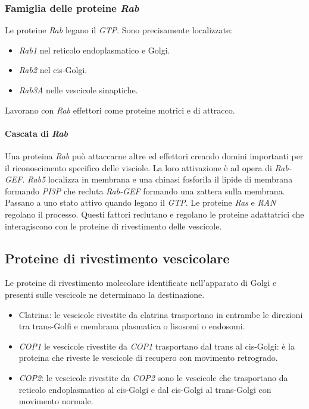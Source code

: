 		\subsubsection{Famiglia delle proteine \emph{Rab}}
		Le proteine \emph{Rab} legano il \emph{GTP}.
		Sono precisamente localizzate:
		\begin{multicols}{3}
			\begin{itemize}
				\item \emph{Rab1} nel reticolo endoplasmatico e Golgi.
				\item \emph{Rab2} nel cis-Golgi.
				\item \emph{Rab3A} nelle vescicole sinaptiche.
			\end{itemize}
		\end{multicols}
		Lavorano con \emph{Rab} effettori come proteine motrici e di attracco.

			\paragraph{Cascata di \emph{Rab}}
			Una proteina \emph{Rab} pu\`o attaccarne altre ed effettori creando domini importanti per il riconoscimento specifico delle visciole.
			La loro attivazione \`e ad opera di \emph{Rab-GEF}.
			\emph{Rab5} localizza in membrana e una chinasi fosforila il lipide di membrana formando \emph{PI3P} che recluta \emph{Rab-GEF} formando una zattera sulla membrana.
			Passano a uno stato attivo quando legano il \emph{GTP}.
			Le proteine \emph{Ras} e \emph{RAN} regolano il processo.
			Questi fattori reclutano e regolano le proteine adattatrici che interagiscono con le proteine di rivestimento delle vescicole.

	\subsection{Proteine di rivestimento vescicolare}
	Le proteine di rivestimento molecolare identificate nell'apparato di Golgi e presenti sulle vescicole ne determinano la destinazione.
	\begin{multicols}{2}
		\begin{itemize}
			\item Clatrina: le vescicole rivestite da clatrina trasportano in entrambe le direzioni tra trans-Golfi e membrana plasmatica o lisosomi o endosomi.
			\item \emph{COP1} le vescicole rivestite da \emph{COP1} trasportano dal trans al cis-Golgi: \`e la proteina che riveste le vescicole di recupero con movimento retrogrado.
			\item \emph{COP2}: le vescicole rivestite da \emph{COP2} sono le vescicole che trasportano da reticolo endoplasmatico al cis-Golgi e dal cis-Golgi al trans-Golgi con movimento normale.
		\end{itemize}
	\end{multicols}

